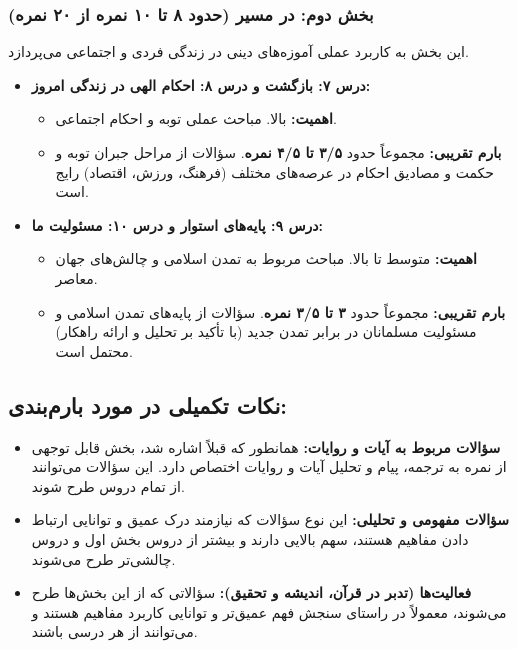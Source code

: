 \documentclass[11pt,a4paper]{article}
\begin{document}
\subsubsection*{بخش دوم: در مسیر (حدود ۸ تا ۱۰ نمره از ۲۰ نمره)}
این بخش به کاربرد عملی آموزه‌های دینی در زندگی فردی و اجتماعی می‌پردازد.

\begin{itemize}
    \item \textbf{درس ۷: بازگشت و درس ۸: احکام الهی در زندگی امروز:}
    \begin{itemize}
        \item \textbf{اهمیت:} بالا. مباحث عملی توبه و احکام اجتماعی.
        \item \textbf{بارم تقریبی:} مجموعاً حدود \textbf{۳/۵ تا ۴/۵ نمره}. سؤالات از مراحل جبران توبه و حکمت و مصادیق احکام در عرصه‌های مختلف (فرهنگ، ورزش، اقتصاد) رایج است.
    \end{itemize}
    \item \textbf{درس ۹: پایه‌های استوار و درس ۱۰: مسئولیت ما:}
    \begin{itemize}
        \item \textbf{اهمیت:} متوسط تا بالا. مباحث مربوط به تمدن اسلامی و چالش‌های جهان معاصر.
        \item \textbf{بارم تقریبی:} مجموعاً حدود \textbf{۳ تا ۳/۵ نمره}. سؤالات از پایه‌های تمدن اسلامی و مسئولیت مسلمانان در برابر تمدن جدید (با تأکید بر تحلیل و ارائه راهکار) محتمل است.
    \end{itemize}
\end{itemize}

\subsection*{نکات تکمیلی در مورد بارم‌بندی:}

\begin{itemize}
    \item \textbf{سؤالات مربوط به آیات و روایات:} همانطور که قبلاً اشاره شد، بخش قابل توجهی از نمره به ترجمه، پیام و تحلیل آیات و روایات اختصاص دارد. این سؤالات می‌توانند از تمام دروس طرح شوند.
    \item \textbf{سؤالات مفهومی و تحلیلی:} این نوع سؤالات که نیازمند درک عمیق و توانایی ارتباط دادن مفاهیم هستند، سهم بالایی دارند و بیشتر از دروس بخش اول و دروس چالشی‌تر طرح می‌شوند.
    \item \textbf{فعالیت‌ها (تدبر در قرآن، اندیشه و تحقیق):} سؤالاتی که از این بخش‌ها طرح می‌شوند، معمولاً در راستای سنجش فهم عمیق‌تر و توانایی کاربرد مفاهیم هستند و می‌توانند از هر درسی باشند.
\end{itemize}
\end{document}
